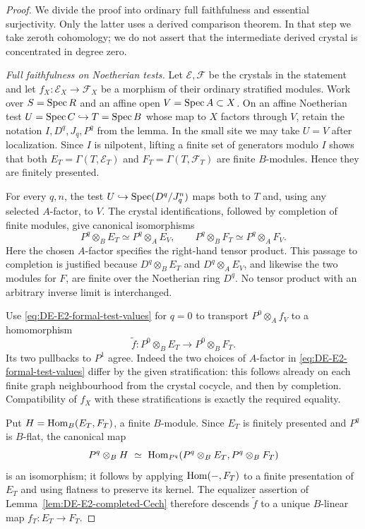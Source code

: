 \begin{proof}
We divide the proof into ordinary full faithfulness and essential surjectivity.  Only the latter uses a derived comparison theorem.  In that step we take zeroth cohomology; we do not assert that the intermediate derived crystal is concentrated in degree zero.

\emph{Full faithfulness on Noetherian tests.}
Let $\mathcal E,\mathcal F$ be the crystals in the statement and let
$f_X:\mathcal E_X\to\mathcal F_X$ be a morphism of their ordinary stratified modules.  Work over $S=\operatorname{Spec} R$ and an affine open $V=\operatorname{Spec} A\subset X$.  On an affine Noetherian test $U=\operatorname{Spec} C\hookrightarrow T=\operatorname{Spec} B$ whose map to $X$ factors through $V$, retain the notation $I,D^q,J_q,P^q$ from the lemma.  In the small site we may take $U=V$ after localization.  Since $I$ is nilpotent, lifting a finite set of generators modulo $I$ shows that both $E_T=\Gamma(T,\mathcal E_T)$ and $F_T=\Gamma(T,\mathcal F_T)$ are finite $B$-modules.  Hence they are finitely presented.

For every $q,n$, the test $U\hookrightarrow\operatorname{Spec}(D^q/J_q^n)$ maps both to $T$ and, using any selected $A$-factor, to $V$.  The crystal identifications, followed by completion of finite modules, give canonical isomorphisms
\begin{equation}\label{eq:DE-E2-formal-test-values}
 P^q\otimes_BE_T\simeq P^q\otimes_AE_V,\qquad
 P^q\otimes_BF_T\simeq P^q\otimes_AF_V.
\end{equation}
Here the chosen $A$-factor specifies the right-hand tensor product.  This passage to completion is justified because $D^q\otimes_BE_T$ and $D^q\otimes_AE_V$, and likewise the two modules for $F$, are finite over the Noetherian ring $D^q$.  No tensor product with an arbitrary inverse limit is interchanged.

Use \eqref{eq:DE-E2-formal-test-values} for $q=0$ to transport $P^0\otimes_Af_V$ to a homomorphism
\[
                 \widetilde f:P^0\otimes_BE_T\longrightarrow P^0\otimes_BF_T.
\]
Its two pullbacks to $P^1$ agree.  Indeed the two choices of $A$-factor in \eqref{eq:DE-E2-formal-test-values} differ by the given stratification: this follows already on each finite graph neighbourhood from the crystal cocycle, and then by completion.  Compatibility of $f_X$ with these stratifications is exactly the required equality.

Put $H=\operatorname{Hom}_B(E_T,F_T)$, a finite $B$-module.  Since $E_T$ is finitely presented and $P^q$ is $B$-flat, the canonical map
\[
 P^q\otimes_BH\ \simeq\
 \operatorname{Hom}_{P^q}(P^q\otimes_BE_T,P^q\otimes_BF_T)
\]
is an isomorphism; it follows by applying $\operatorname{Hom}(-,F_T)$ to a finite presentation of $E_T$ and using flatness to preserve its kernel.  The equalizer assertion of Lemma~\ref{lem:DE-E2-completed-Cech} therefore descends $\widetilde f$ to a unique $B$-linear map $f_T:E_T\to F_T$.


\end{proof}
